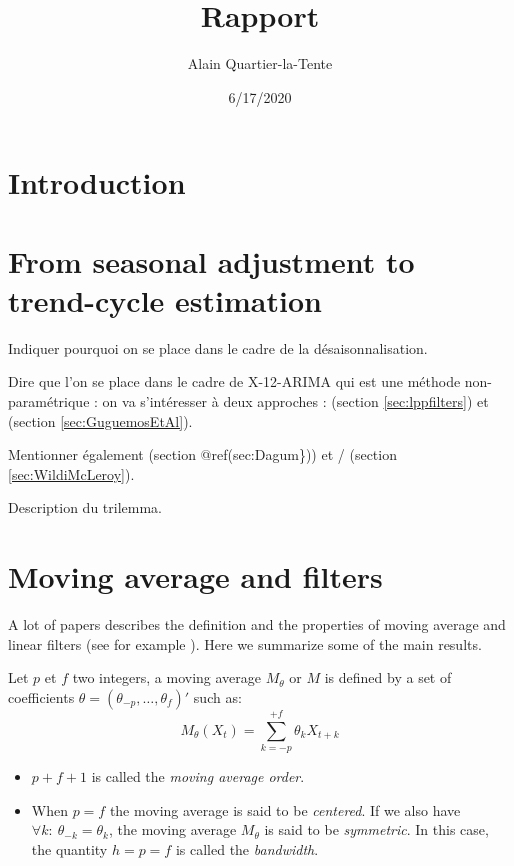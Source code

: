 \documentclass[
  12pt,
  ,
  a4paper]{article}
\title{Rapport}
\author{Alain Quartier-la-Tente}
\date{6/17/2020}
\newcommand\1{\mathds{1}}
\begin{document}
\maketitle

{
\hypersetup{linkcolor=}
\setcounter{tocdepth}{3}
\tableofcontents
}
\newpage

\hypertarget{introduction}{%
\section{Introduction}\label{introduction}}

\hypertarget{from-seasonal-adjustment-to-trend-cycle-estimation}{%
\section{From seasonal adjustment to trend-cycle estimation}\label{from-seasonal-adjustment-to-trend-cycle-estimation}}

Indiquer pourquoi on se place dans le cadre de la désaisonnalisation.

Dire que l'on se place dans le cadre de X-12-ARIMA qui est une méthode non-paramétrique : on va s'intéresser à deux approches : \textcite{proietti2008} (section \ref{sec:lppfilters}) et \textcite{ch15HBSA} (section \ref{sec:GuguemosEtAl}).

Mentionner également \textcite{ch14HBSA} (section @ref(sec:Dagum\})) et \textcite{ch16HBSA} / \textcite{trilemmaWMR2019} (section \ref{sec:WildiMcLeroy}).

Description du trilemma.

\hypertarget{sec:propMM}{%
\section{Moving average and filters}\label{sec:propMM}}

A lot of papers describes the definition and the properties of moving average and linear filters (see for example \textcite{ch12HBSA}).
Here we summarize some of the main results.

Let \(p\) et \(f\) two integers, a moving average \(M_\theta\) or \(M\) is defined by a set of coefficients \(\theta=(\theta_{-p},\dots,\theta_{f})'\) such as:
\[
M_\theta(X_t)=\sum_{k=-p}^{+f}\theta_kX_{t+k}
\]

\begin{itemize}
\item
  \(p+f+1\) is called the \emph{moving average order}.
\item
  When \(p=f\) the moving average is said to be \emph{centered}.
  If we also have \(\forall k:\:\theta_{-k} = \theta_k\), the moving average \(M_\theta\) is said to be \emph{symmetric}.
  In this case, the quantity \(h=p=f\) is called the \emph{bandwidth}.
\end{itemize}
\end{document}
